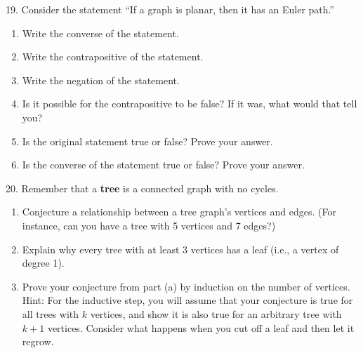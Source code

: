 \documentclass[10pt,]{book}
\newcommand{\terminology}[1]{\textbf{#1}}
\theoremstyle{plain}
\theoremstyle{definition}
\numberwithin{equation}{chapter}
\begin{document}
\begin{exerciselist}
\par\smallskip
\item[19.]\hypertarget{exercise-338}{}
            Consider the statement ``If a graph is planar, then it has an Euler path.''
          \leavevmode%
\begin{enumerate}[label=(\alph*)]
\item\hypertarget{li-864}{}
                Write the converse of the statement.
\item\hypertarget{li-865}{}
                Write the contrapositive of the statement.
\item\hypertarget{li-866}{}
                Write the negation of the statement.
\item\hypertarget{li-867}{}
                Is it possible for the contrapositive to be false? If it was, what would that tell you?
\item\hypertarget{li-868}{}
                Is the original statement true or false? Prove your answer.
\item\hypertarget{li-869}{}
                Is the converse of the statement true or false? Prove your answer.
\end{enumerate}

\par\smallskip
\item[20.]\hypertarget{exercise-339}{}
            Remember that a \terminology{tree} is a connected graph with no cycles.
          \leavevmode%
\begin{enumerate}[label=(\alph*)]
\item\hypertarget{li-876}{}
                Conjecture a relationship between a tree graph's vertices and edges. (For instance, can you have a tree with 5 vertices and 7 edges?)


\item\hypertarget{li-877}{}
                Explain why every tree with at least 3 vertices has a leaf (i.e., a vertex of degree 1).


\item\hypertarget{li-878}{}
                Prove your conjecture from part (a) by induction on the number of vertices. Hint: For the inductive step, you will assume that your conjecture is true for all trees with \(k\) vertices, and show it is also true for an arbitrary tree with \(k+1\) vertices. Consider what happens when you cut off a leaf and then let it regrow.


\end{enumerate}

\par\smallskip
\end{exerciselist}
\end{document}
